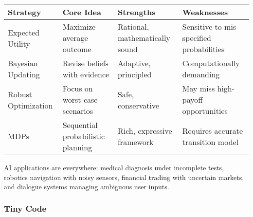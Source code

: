 \documentclass[
  letterpaper,
  DIV=11,
  numbers=noendperiod]{scrreprt}
\begin{document}
\begin{longtable}[]{@{}
  >{\raggedright\arraybackslash}p{}
  >{\raggedright\arraybackslash}p{}
  >{\raggedright\arraybackslash}p{}
  >{\raggedright\arraybackslash}p{}@{}}
\toprule\noalign{}
\begin{minipage}[b]{\linewidth}\raggedright
Strategy
\end{minipage} & \begin{minipage}[b]{\linewidth}\raggedright
Core Idea
\end{minipage} & \begin{minipage}[b]{\linewidth}\raggedright
Strengths
\end{minipage} & \begin{minipage}[b]{\linewidth}\raggedright
Weaknesses
\end{minipage} \\
\midrule\noalign{}
\endhead
\bottomrule\noalign{}
\endlastfoot
Expected Utility & Maximize average outcome & Rational, mathematically
sound & Sensitive to mis-specified probabilities \\
Bayesian Updating & Revise beliefs with evidence & Adaptive, principled
& Computationally demanding \\
Robust Optimization & Focus on worst-case scenarios & Safe, conservative
& May miss high-payoff opportunities \\
MDPs & Sequential probabilistic planning & Rich, expressive framework &
Requires accurate transition model \\
\end{longtable}

AI applications are everywhere: medical diagnosis under incomplete
tests, robotics navigation with noisy sensors, financial trading with
uncertain markets, and dialogue systems managing ambiguous user inputs.

\subsubsection{Tiny Code}\label{tiny-code-67}
\end{document}
